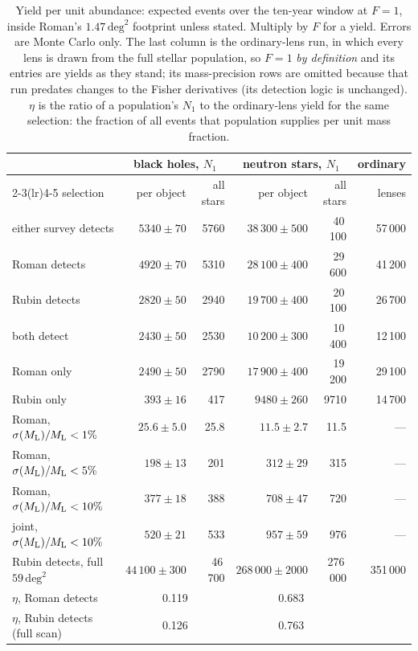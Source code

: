 \documentclass[english,10pt,a4paper]{article}
\newcommand{\Ml}{M_{\rm L}}
\begin{document}
\begin{table}[h]
\centering
\caption{Yield per unit abundance: expected events over the ten-year window at $F=1$, inside
Roman's $1.47\,\mathrm{deg}^2$ footprint unless stated. Multiply by $F$ for a yield. Errors are
Monte Carlo only. The last column is the ordinary-lens run, in which every lens is drawn from
the full stellar population, so $F=1$ \emph{by definition} and its entries are yields as they
stand; its mass-precision rows are omitted because that run predates changes to the Fisher
derivatives (its detection logic is unchanged). $\eta$ is the ratio of a population's $N_1$ to
the ordinary-lens yield for the same selection: the fraction of all events that population
supplies per unit mass fraction.}
\label{tab:n1}
\small
\begin{tabular}{lrrrrr}
\toprule
 & \multicolumn{2}{c}{black holes, $N_1$} & \multicolumn{2}{c}{neutron stars, $N_1$} & ordinary \\
\cmidrule(lr){2-3}\cmidrule(lr){4-5}
selection & per object & all stars & per object & all stars & lenses \\
\midrule
either survey detects        & $5340\pm70$  & 5760 & $38\,300\pm500$ & 40\,100 & 57\,000 \\
Roman detects                & $4920\pm70$  & 5310 & $28\,100\pm400$ & 29\,600 & 41\,200 \\
Rubin detects                & $2820\pm50$  & 2940 & $19\,700\pm400$ & 20\,100 & 26\,700 \\
both detect                  & $2430\pm50$  & 2530 & $10\,200\pm300$ & 10\,400 & 12\,100 \\
Roman only                   & $2490\pm50$  & 2790 & $17\,900\pm400$ & 19\,200 & 29\,100 \\
Rubin only                   & $393\pm16$   & 417  & $9480\pm260$    & 9710    & 14\,700 \\
Roman, $\sigma(\Ml)/\Ml<1\%$  & $25.6\pm5.0$ & 25.8 & $11.5\pm2.7$    & 11.5    & --- \\
Roman, $\sigma(\Ml)/\Ml<5\%$  & $198\pm13$   & 201  & $312\pm29$      & 315     & --- \\
Roman, $\sigma(\Ml)/\Ml<10\%$ & $377\pm18$   & 388  & $708\pm47$      & 720     & --- \\
joint, $\sigma(\Ml)/\Ml<10\%$ & $520\pm21$   & 533  & $957\pm59$      & 976     & --- \\
\midrule
Rubin detects, full $59\,\mathrm{deg}^2$ & $44\,100\pm300$ & 46\,700 & $268\,000\pm2000$ & 276\,000 & 351\,000 \\
\midrule
$\eta$, Roman detects        & \multicolumn{2}{c}{0.119} & \multicolumn{2}{c}{0.683} & \\
$\eta$, Rubin detects (full scan) & \multicolumn{2}{c}{0.126} & \multicolumn{2}{c}{0.763} & \\
\bottomrule
\end{tabular}
\end{table}
\end{document}
